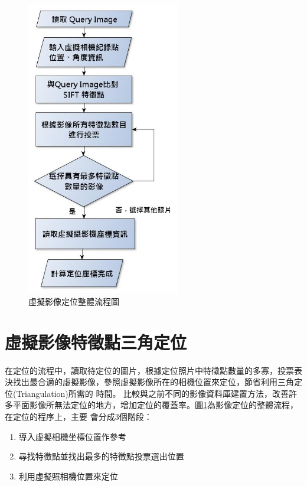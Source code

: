 \begin{figure}
\begin{center}
  \includegraphics[width=0.6\textwidth]{figures/Localization_Process.jpg}
  \caption{虛擬影像定位整體流程圖}
  \label{fig:Lolcalization Process}  
\end{center}
\end{figure}

\section{虛擬影像特徵點三角定位}

	在定位的流程中，讀取待定位的圖片，根據定位照片中特徵點數量的多寡，投票表決找出最合適的虛擬影像，參照虛擬影像所在的相機位置來定位，節省利用三角定位(Triangulation)所需的
	時間。
	比較與之前不同的影像資料庫建置方法，改善許多平面影像所無法定位的地方，增加定位的覆蓋率。圖\ref{fig:Lolcalization Process}為影像定位的整體流程，在定位的程序上，主要
	會分成3個階段：
		\begin{enumerate}
			\item 導入虛擬相機坐標位置作參考
    		\item 尋找特徵點並找出最多的特徵點投票選出位置
    		\item 利用虛擬照相機位置來定位
		\end{enumerate} 
		
